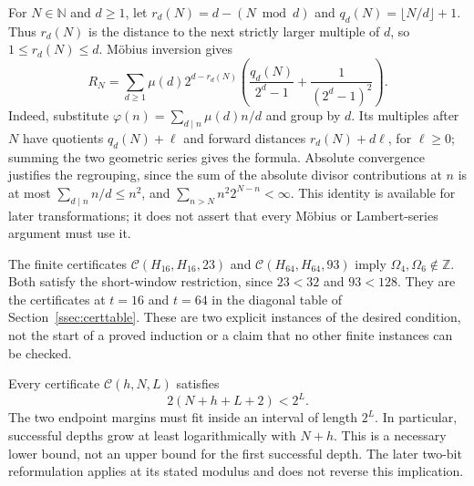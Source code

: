 \begin{prop}\label{prop:MP-01-inv}

For $N\in\mathbb N$ and $d\ge1$, let
$r_d(N)=d-(N\bmod d)$ and $q_d(N)=\lfloor N/d\rfloor+1$.
Thus $r_d(N)$ is the distance to the next strictly larger multiple of
$d$, so $1\le r_d(N)\le d$. M\"obius inversion gives
\[
 R_N=\sum_{d\ge1}\mu(d)2^{d-r_d(N)}
 \left(\frac{q_d(N)}{2^d-1}+\frac{1}{(2^d-1)^2}\right).
\]
Indeed, substitute $\varphi(n)=\sum_{d\mid n}\mu(d)n/d$ and group
by $d$. Its multiples after $N$ have quotients $q_d(N)+\ell$ and
forward distances $r_d(N)+d\ell$, for $\ell\ge0$; summing the two
geometric series gives the formula. Absolute convergence justifies the
regrouping, since the sum of the absolute divisor contributions at $n$
is at most $\sum_{d\mid n}n/d\le n^2$, and
$\sum_{n>N}n^2 2^{N-n}<\infty$.
This identity is available for later transformations; it does not
assert that every M\"obius or Lambert-series argument must use it.

\end{prop}

\begin{prop}\label{prop:SK-01-inv}
The finite certificates
$\mathcal C(H_{16},H_{16},23)$ and
$\mathcal C(H_{64},H_{64},93)$ imply
$\Omega_4,\Omega_6\notin\mathbb Z$. Both satisfy the short-window
restriction, since $23<32$ and $93<128$. They are the certificates at
$t=16$ and $t=64$ in the diagonal table of Section~\ref{ssec:certtable}.
These are two explicit instances of the desired condition, not the
start of a proved induction or a claim that no other finite instances
can be checked.

\end{prop}

\begin{prop}\label{prop:A5-inv}
Every certificate $\mathcal C(h,N,L)$ satisfies
\[
 2(N+h+L+2)<2^L.
\]
The two endpoint margins must fit inside an interval of length $2^L$.
In particular, successful depths grow at least logarithmically with
$N+h$. This is a necessary lower bound, not an upper bound for the
first successful depth. The later two-bit reformulation applies at its
stated modulus and does not reverse this implication.

\end{prop}

